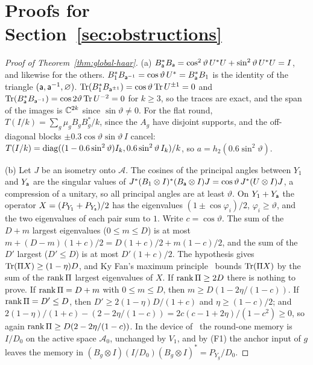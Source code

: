 \section{Proofs for Section~\ref{sec:obstructions}}\label{app:obstructions}

\begin{proof}[Proof of Theorem~\ref{thm:global-haar}]
(a) $B_\mathsf a^*B_\mathsf a=\cos^2\vartheta\,U^*U+\sin^2\vartheta\,U^*U=I$, and likewise for the others. $B_1^*B_{\mathsf a^{-1}}=\cos\vartheta\,U^*=B_\mathsf a^*B_1$ is the identity of the triangle
$(\mathsf a,\mathsf a^{-1},\varnothing)$. $\operatorname{Tr}(B_1^*B_{\mathsf a^{\pm1}})=\cos\vartheta\operatorname{Tr} U^{\pm1}=0$ and $\operatorname{Tr}(B_\mathsf a^*B_{\mathsf a^{-1}})=\cos2\vartheta\operatorname{Tr} U^{-2}=0$ for $k\ge3$, so the traces are exact, and the
span of the images is $\mathbb C^{2k}$ since $\sin\vartheta\ne0$. For the flat round, $T(I/k)=\sum_g\mu_gB_gB_g^*/k$, since the $A_g$ have disjoint supports, and the off-diagonal blocks
$\pm0.3\cos\vartheta\sin\vartheta\,I$ cancel: $T(I/k)=\operatorname{diag}((1-0.6\sin^2\vartheta)I_k,0.6\sin^2\vartheta\,I_k)/k$, so $a=h_2(0.6\sin^2\vartheta)$.

(b) Let $J$ be an isometry onto $\mathcal A$. The cosines of the principal angles between $Y_1$ and $Y_\mathsf a$ are the singular values of
$J^*(B_1\otimes I)^*(B_\mathsf a\otimes I)J=\cos\vartheta\,J^*(U\otimes I)J$, a compression of a unitary, so all principal angles are at least $\vartheta$. On $Y_1+Y_\mathsf a$ the operator
$X=(P_{Y_1}+P_{Y_\mathsf a})/2$ has the eigenvalues $(1\pm\cos\varphi_i)/2$, $\varphi_i\ge\vartheta$, and the two eigenvalues of each pair sum to $1$. Write $c=\cos\vartheta$. The sum of the
$D+m$ largest eigenvalues ($0\le m\le D$) is at most $m+(D-m)(1+c)/2=D(1+c)/2+m(1-c)/2$, and the sum of the $D'$ largest ($D'\le D$) is at most $D'(1+c)/2$. The hypothesis gives
$\operatorname{Tr}(\Pi X)\ge(1-\eta)D$, and Ky Fan's maximum principle~\cite[Theorem~1]{Fan1949} bounds $\operatorname{Tr}(\Pi X)$ by the sum of the $\operatorname{rank}\Pi$ largest eigenvalues of $X$. If
$\operatorname{rank}\Pi\ge2D$ there is nothing to prove. If $\operatorname{rank}\Pi=D+m$ with $0\le m\le D$, then $m\ge D(1-2\eta/(1-c))$. If $\operatorname{rank}\Pi=D'\le D$, then $D'\ge2(1-\eta)D/(1+c)$ and
$\eta\ge(1-c)/2$; and $2(1-\eta)/(1+c)-(2-2\eta/(1-c))=2c(c-1+2\eta)/(1-c^2)\ge0$, so again $\operatorname{rank}\Pi\ge D(2-2\eta/(1-c))$. In the device
of~\cite[Theorem~12.2]{DouglasMghirbiC} the round-one memory is $I/D_0$ on the active space $\mathcal A_0$, unchanged by $V_1$, and by (F1) the anchor input of $g$ leaves the memory
in $(B_g\otimes I)(I/D_0)(B_g\otimes I)^*=P_{Y_g}/D_0$.


\end{proof}
